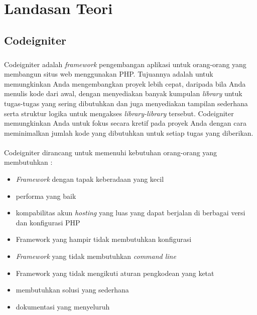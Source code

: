\chapter{Landasan Teori}
\label{chap:teori}

\section{Codeigniter}
\label{sec:codeigniter} 
 
\paragraph{} Codeigniter adalah \textit{framework} pengembangan aplikasi untuk orang-orang yang membangun situs web menggunakan PHP. Tujuannya adalah untuk memungkinkan Anda mengembangkan proyek lebih cepat, daripada bila Anda menulis kode dari awal, dengan menyediakan banyak kumpulan \textit{library} untuk tugas-tugas yang sering dibutuhkan dan juga menyediakan tampilan sederhana serta struktur logika untuk mengakses \textit{library-library} tersebut. Codeigniter memungkinkan Anda untuk fokus secara kretif pada proyek Anda dengan cara meminimalkan jumlah kode yang dibutuhkan untuk setiap tugas yang diberikan.
\\
\\
Codeigniter dirancang untuk memenuhi kebutuhan orang-orang yang membutuhkan :
\begin{itemize}
		\item \textit{Framework} dengan tapak keberadaan yang kecil
		\item performa yang baik
		\item kompabilitas akun \textit{hosting} yang luas yang dapat berjalan di berbagai versi dan konfigurasi PHP
		\item Framework yang hampir tidak membutuhkan konfigurasi
		\item \textit{Framework} yang tidak membutuhkan \textit{command line}
		\item Framework yang tidak mengikuti aturan pengkodean yang ketat
		\item membutuhkan solusi yang sederhana
		\item dokumentasi yang menyeluruh
	\end{itemize}
